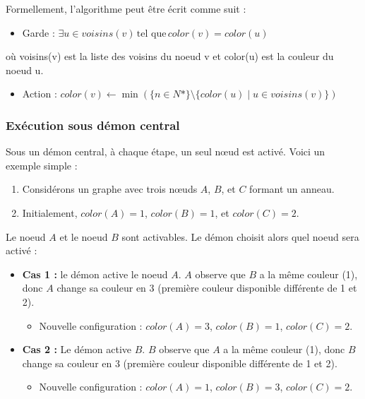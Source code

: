 \documentclass[11pt]{article}
\begin{document}
Formellement, l'algorithme peut être écrit comme suit :
\begin{itemize}
\item Garde : \(\exists u \in voisins(v) \, \text{tel que} \, color(v) = color(u)\)
\end{itemize}
où voisins(v) est la liste des voisins du noeud v et color(u) est la couleur du noeud u.
\begin{itemize}
\item Action : \(color(v) \leftarrow \min(\{n \in N* \} \setminus \{color(u) \mid u \in voisins(v)\})\)
\end{itemize}

\subsubsection{Exécution sous démon central}
\label{sec:orgfb5a9a2}
Sous un démon central, à chaque étape, un seul nœud est activé. Voici un exemple simple :

\begin{enumerate}
\item Considérons un graphe avec trois nœuds \(A\), \(B\), et \(C\) formant un anneau.
\item Initialement, \(color(A) = 1\), \(color(B) = 1\), et \(color(C) = 2\).
\end{enumerate}

Le noeud \(A\) et le noeud \(B\) sont activables.
Le démon choisit alors quel noeud sera activé :  

\begin{itemize}
\item \textbf{\textbf{Cas 1 :}} le démon active le noeud \(A\). \(A\) observe que \(B\) a la même couleur (1), donc \(A\) change sa couleur en 3 (première couleur disponible différente de 1 et 2).
\begin{itemize}
\item Nouvelle configuration : \(color(A) = 3\), \(color(B) = 1\), \(color(C) = 2\).
\end{itemize}
\item \textbf{\textbf{Cas 2 :}} Le démon active \(B\). \(B\) observe que \(A\) a la même couleur (1), donc \(B\) change sa couleur en 3 (première couleur disponible différente de 1 et 2).
\begin{itemize}
\item Nouvelle configuration : \(color(A) = 1\), \(color(B) = 3\), \(color(C) = 2\).
\end{itemize}
\end{itemize}
\end{document}
